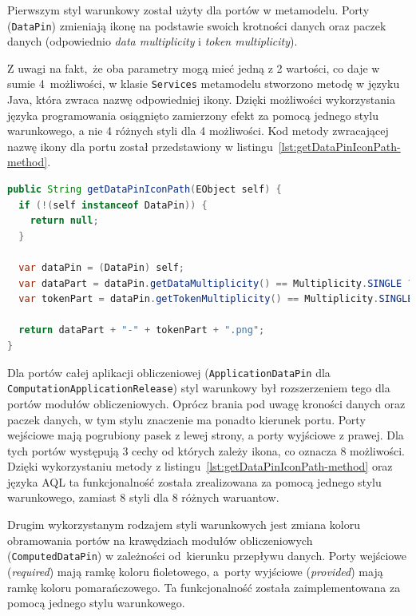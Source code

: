 Pierwszym styl warunkowy został użyty dla portów w metamodelu. Porty
(\texttt{DataPin}) zmieniają ikonę na podstawie swoich krotności danych oraz
paczek danych (odpowiednio \emph{data multiplicity} i \emph{token
	multiplicity}).

Z uwagi na fakt, że oba parametry mogą mieć jedną z 2 wartości,
co daje w sumie 4~możliwości, w klasie \texttt{Services} metamodelu stworzono
metodę w języku Java, która zwraca nazwę odpowiedniej ikony.
Dzięki możliwości wykorzystania języka programowania osiągnięto
zamierzony efekt za pomocą jednego stylu warunkowego, a nie 4 różnych
styli dla 4 możliwości. Kod metody zwracającej nazwę ikony dla portu
został przedstawiony w listingu~\ref{lst:getDataPinIconPath-method}.

\begin{lstlisting}[language=Java,
    caption={Methoda zwracająca nazwę ikony dla portu.},
    label={lst:getDataPinIconPath-method}]
public String getDataPinIconPath(EObject self) {
  if (!(self instanceof DataPin)) {
    return null;
  }

  var dataPin = (DataPin) self;
  var dataPart = dataPin.getDataMultiplicity() == Multiplicity.SINGLE ? "single-data" : "multiple-data";
  var tokenPart = dataPin.getTokenMultiplicity() == Multiplicity.SINGLE ? "single-token" : "multiple-tokens";

  return dataPart + "-" + tokenPart + ".png";
}
\end{lstlisting}

Dla portów całej aplikacji obliczeniowej (\texttt{ApplicationDataPin} dla
\texttt{ComputationApplicationRelease}) styl warunkowy był rozszerzeniem tego
dla portów modułów obliczeniowych. Oprócz brania pod uwagę kroności danych oraz
paczek danych, w tym stylu znaczenie ma ponadto kierunek portu. Porty wejściowe
mają pogrubiony pasek z lewej strony, a porty wyjściowe z prawej. Dla tych
portów występują 3 cechy od których zależy ikona, co oznacza 8 możliwości.
Dzięki wykorzystaniu metody z listingu~\ref{lst:getDataPinIconPath-method} oraz
języka \gls{AQL} ta funkcjonalność została zrealizowana za pomocą jednego stylu
warunkowego, zamiast 8 styli dla 8 różnych waruantow.

Drugim wykorzystanym rodzajem styli warunkowych jest zmiana koloru obramowania
portów na krawędziach modułów obliczeniowych (\texttt{ComputedDataPin}) w
zależności od~kierunku przepływu danych. Porty wejściowe (\emph{required}) mają
ramkę koloru fioletowego, a~porty wyjściowe (\emph{provided}) mają ramkę koloru
pomarańczowego. Ta funkcjonalność została zaimplementowana za pomocą jednego
stylu warunkowego.

